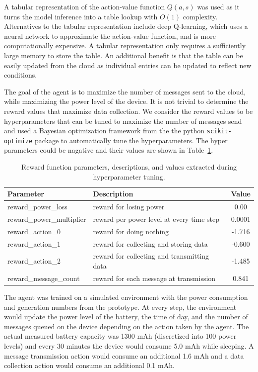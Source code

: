 \documentclass[10pt]{cai}
\begin{document}
A tabular representation of the action-value function $Q(a,s)$ was used as it turns the model inference into a table lookup with $O(1)$ complexity.
Alternatives to the tabular representation include deep Q-learning, which uses a neural network to approximate the action-value function, and is more computationally expensive.
A tabular representation only requires a sufficiently large memory to store the table.
An additional benefit is that the table can be easily updated from the cloud as individual entries can be updated to reflect new conditions.

The goal of the agent is to maximize the number of messages sent to the cloud, while maximizing the power level of the device.
It is not trivial to determine the reward values that maximize data collection.
We consider the reward values to be hyperparameters that can be tuned to maximize the number of messages send and used a Bayesian optimization framework from the the python \verb|scikit-optimize| package to automatically tune the hyperparameters.
The hyper parameters could be nagative and their values are shown in Table~\ref{tab:reward_parameters}.

\begin{table}[h]
  \centering
  \caption{Reward function parameters, descriptions, and values extracted during hyperparameter tuning.}
  \begin{tabular}{l p{8cm} c}
      \toprule
      \textbf{Parameter} & \textbf{Description} & \textbf{Value} \\
      \midrule
      reward\_power\_loss & reward for losing power & 0.00  \\ 
      reward\_power\_multiplier & reward per power level at every time step & 0.0001  \\ 
      reward\_action\_0 & reward for doing nothing & -1.716 \\ 
      reward\_action\_1 & reward for collecting and storing data & -0.600 \\ 
      reward\_action\_2 & reward for collecting and transmitting data & -1.485 \\ 
      reward\_message\_count & reward for each message at transmission & 0.841 \\ 
      \bottomrule
  \end{tabular}
  \label{tab:reward_parameters}
\end{table}

The agent was trained on a simulated environment with the power consumption and generation numbers from the prototype.
At every step, the environment would update the power level of the battery, the time of day, and the number of messages queued on the device depending on the action taken by the agent.
The actual measured battery capacity was 1300 mAh (discretized into 100 power levels) and every 30 minutes the device would consume 5.0 mAh while sleeping.
A message transmission action would consume an additional 1.6 mAh and a data collection action would consume an additional 0.1 mAh.
\end{document}
